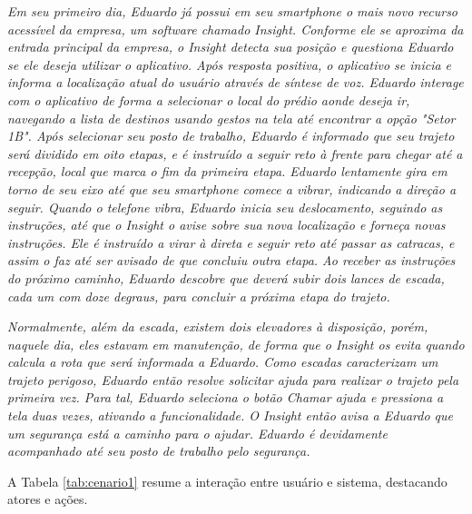 \documentclass[twoside,english,brazilian]{UNISINOSartigo}
\begin{document}
\textit{Em seu primeiro dia, Eduardo já possui em seu smartphone o mais novo recurso acessível da empresa, um software chamado Insight. Conforme ele se aproxima da entrada principal da empresa, o Insight detecta sua posição e questiona Eduardo se ele deseja utilizar o aplicativo. Após resposta positiva, o aplicativo se inicia e informa a localização atual do usuário através de síntese de voz. Eduardo interage com o aplicativo de forma a selecionar o local do prédio aonde deseja ir, navegando a lista de destinos usando gestos na tela até encontrar a opção "Setor 1B". Após selecionar seu posto de trabalho, Eduardo é informado que seu trajeto será dividido em oito etapas, e é instruído a seguir reto à frente para chegar até a recepção, local que marca o fim da primeira etapa. Eduardo lentamente gira em torno de seu eixo até que seu smartphone comece a vibrar, indicando a direção a seguir. Quando o telefone vibra, Eduardo inicia seu deslocamento, seguindo as instruções, até que o Insight o avise sobre sua nova localização e forneça novas instruções. Ele é instruído a virar à direta e seguir reto até passar as catracas, e assim o faz até ser avisado de que concluiu outra etapa. Ao receber as instruções do próximo caminho, Eduardo descobre que deverá subir dois lances de escada, cada um com doze degraus, para concluir a próxima etapa do trajeto.}

\textit{Normalmente, além da escada, existem dois elevadores à disposição, porém, naquele dia, eles estavam em manutenção, de forma que o Insight os evita quando calcula a rota que será informada a Eduardo. Como escadas caracterizam um trajeto perigoso, Eduardo então resolve solicitar ajuda para realizar o trajeto pela primeira vez. Para tal, Eduardo seleciona o botão Chamar ajuda e pressiona a tela duas vezes, ativando a funcionalidade. O Insight então avisa a Eduardo que um segurança está a caminho para o ajudar. Eduardo é devidamente acompanhado até seu posto de trabalho pelo segurança.}

A Tabela \ref{tab:cenario1} resume a interação entre usuário e sistema, destacando atores e ações.
\end{document}
